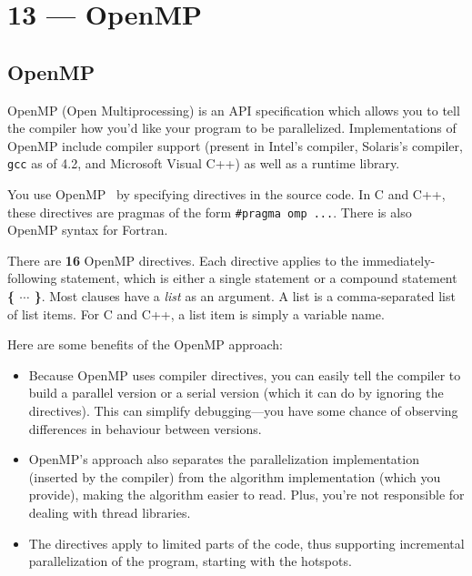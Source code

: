 \documentclass[a4paper]{report}
\begin{document}
\chapter*{13 --- OpenMP}


\section*{OpenMP}


OpenMP (Open Multiprocessing) 
is an API specification which allows you to tell the compiler how you'd 
like your program to be parallelized. Implementations of OpenMP 
include compiler support (present in Intel's compiler, Solaris's 
compiler, {\tt gcc} as of 4.2, and Microsoft Visual C++) as well as a 
runtime library.

You use OpenMP~\cite{omptutorial} by specifying
directives in the source code. In C and C++, these directives are
pragmas of the form \verb+#pragma omp ...+. There is also OpenMP
syntax for Fortran. 

There are {\bf 16} OpenMP directives. Each directive applies to the immediately-following statement, which is either a single statement or a compound statement {\bf \{  $\cdots$ \}}. Most clauses have a \emph{list} as an argument. 
A list is a comma-separated list of list items. For C and C++, a list item 
is simply a variable name.


Here are some benefits of the OpenMP approach:
\begin{itemize}
\item Because OpenMP uses compiler directives, you can easily tell the
  compiler to build a parallel version or a serial version (which it can do by
  ignoring the directives). This can simplify debugging---you
  have some chance of observing differences in behaviour between 
  versions.
\item OpenMP's approach also separates the parallelization
  implementation (inserted by the compiler) from the algorithm
  implementation (which you provide), making the algorithm easier to
  read. Plus, you're not responsible for dealing with thread libraries.
\item The directives apply to limited parts of the code, thus supporting
  incremental parallelization of the program, starting with the hotspots.
\end{itemize}
\end{document}
